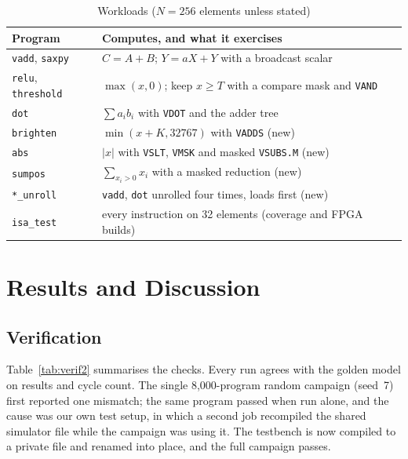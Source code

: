 \begin{table}[t]
\centering
\caption{Workloads ($N = 256$ elements unless stated)}
\label{tab:work2}
\footnotesize
\begin{tabular}{@{}lL{4.9cm}@{}}
\toprule
Program & Computes, and what it exercises \\
\midrule
\texttt{vadd}, \texttt{saxpy} & $C = A + B$; $Y = aX + Y$ with a broadcast scalar \\
\texttt{relu}, \texttt{threshold} & $\max(x, 0)$; keep $x \geq T$ with a compare mask and \texttt{VAND} \\
\texttt{dot} & $\sum a_i b_i$ with \texttt{VDOT} and the adder tree \\
\texttt{brighten} & $\min(x + K, 32767)$ with \texttt{VADDS} (new) \\
\texttt{abs} & $|x|$ with \texttt{VSLT}, \texttt{VMSK} and masked \texttt{VSUBS.M} (new) \\
\texttt{sumpos} & $\sum_{x_i > 0} x_i$ with a masked reduction (new) \\
\texttt{*\_unroll} & \texttt{vadd}, \texttt{dot} unrolled four times, loads first (new) \\
\texttt{isa\_test} & every instruction on 32 elements (coverage and FPGA builds) \\
\bottomrule
\end{tabular}
\end{table}

\section{Results and Discussion}\label{sec:results}

\subsection{Verification}
Table~\ref{tab:verif2} summarises the checks. Every run agrees with the golden model on
results and cycle count. The single 8,000-program random campaign (seed~7) first
reported one mismatch; the same program passed when run alone, and the cause was our
own test setup, in which a second job recompiled the shared simulator file while the
campaign was using it. The testbench is now compiled to a private file and renamed into
place, and the full campaign passes.

